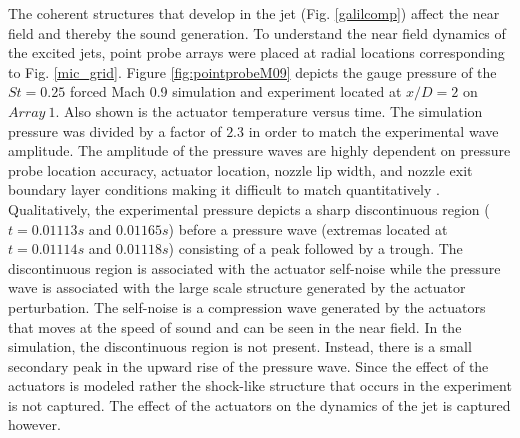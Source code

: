 \documentclass[english]{aiaa-tc}
\begin{document}
The coherent structures that develop in the jet (Fig. \ref{galilcomp}) affect the near field and thereby the sound generation. 
To understand the near field dynamics of the excited jets, point probe arrays were placed at radial locations corresponding to Fig. \ref{mic_grid}. 
Figure \ref{fig:pointprobeM09} depicts the gauge pressure of the $St=0.25$ forced Mach 0.9 simulation and experiment located at $x/D=2$ on $Array~1$. Also shown is the actuator temperature versus time. The simulation pressure was divided by a factor of $2.3$ in order to match the experimental wave amplitude. The amplitude of the pressure waves are highly dependent on pressure probe location accuracy, actuator location, nozzle lip width, and nozzle exit boundary layer conditions making it difficult to match quantitatively \cite{sinha2013}. Qualitatively, the experimental pressure depicts a sharp discontinuous region ($t=0.01113s$ and $0.01165s$)  before a pressure wave (extremas located at $t=0.01114s$ and $0.01118s$) consisting of a peak followed by a trough. The discontinuous region is associated with the actuator self-noise while the pressure wave is associated with the large scale structure generated by the actuator perturbation. The self-noise is a compression wave generated by the actuators that moves at the speed of sound and can be seen in the near field. In the simulation, the discontinuous region is not present. Instead, there is a small secondary peak in the upward rise of the pressure wave. Since the effect of the actuators is modeled rather the shock-like structure that occurs in the experiment is not captured. The effect of the actuators on the dynamics of the jet is captured however. 
\end{document}

